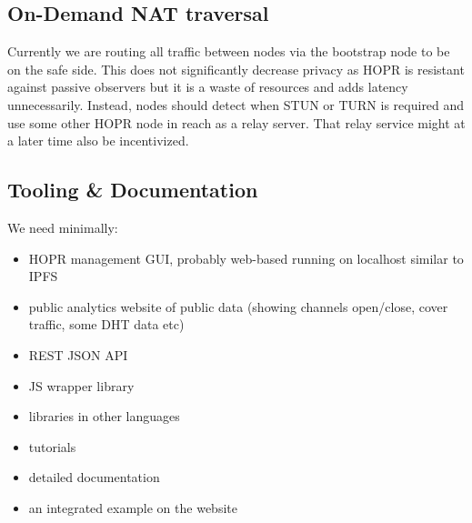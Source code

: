 \subsection{On-Demand NAT traversal}
Currently we are routing all traffic between nodes via the bootstrap node to be on the safe side. This does not significantly decrease privacy as HOPR is resistant against passive observers but it is a waste of resources and adds latency unnecessarily. Instead, nodes should detect when STUN or TURN is required and use some other HOPR node in reach as a relay server. That relay service might at a later time also be incentivized. 

\subsection{Tooling \& Documentation}
We need minimally:
\begin{itemize}
    \item HOPR management GUI, probably web-based running on localhost similar to IPFS
    \item public analytics website of public data (showing channels open/close, cover traffic, some DHT data etc)
    \item REST JSON API
    \item JS wrapper library
    \item libraries in other languages
    \item tutorials
    \item detailed documentation
    \item an integrated example on the website
\end{itemize}
